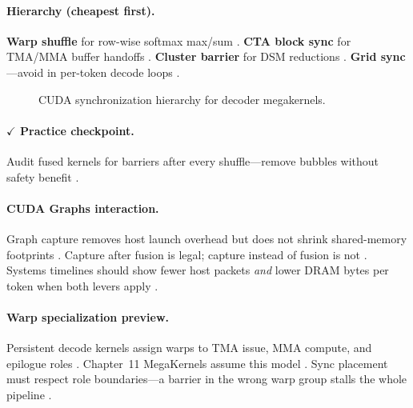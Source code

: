 \paragraph{Hierarchy (cheapest first).}
\textbf{Warp shuffle} for row-wise softmax max/sum \citep{dao2022flashattention}.
\textbf{CTA block sync} for TMA/MMA buffer handoffs \citep{semianalysis2024tma}.
\textbf{Cluster barrier} for DSM reductions \citep{nvidia2022hopper}.
\textbf{Grid sync}---avoid in per-token decode loops \citep{taxbreak2026}.

\begin{figure}[t]
\centering
{}
\caption{CUDA synchronization hierarchy for decoder megakernels.}
\label{fig:cuda_sync_levels}
\end{figure}

\paragraph{$\checkmark$ Practice checkpoint.}
Audit fused kernels for barriers after every shuffle---remove bubbles without safety benefit \citep{dao2022flashattention,dlbook}.

\paragraph{CUDA Graphs interaction.}
Graph capture removes host launch overhead but does not shrink shared-memory footprints \citep{nvidia2024cudagraphs,memoryfloor2026}.
Capture after fusion is legal; capture instead of fusion is not \citep{taxbreak2026,yirage2026}.
Systems timelines should show fewer host packets \emph{and} lower DRAM bytes per token when both levers apply \citep{patel2025llminference}.

\paragraph{Warp specialization preview.}
Persistent decode kernels assign warps to TMA issue, MMA compute, and epilogue roles \citep{semianalysis2024tma,nvidia2022hopper,taxbreak2026}.
Chapter~11 MegaKernels assume this model \citep{dao2022flashattention,dao2023flashdecoding,yirage2026}.
Sync placement must respect role boundaries---a barrier in the wrong warp group stalls the whole pipeline \citep{patel2025llminference}.

